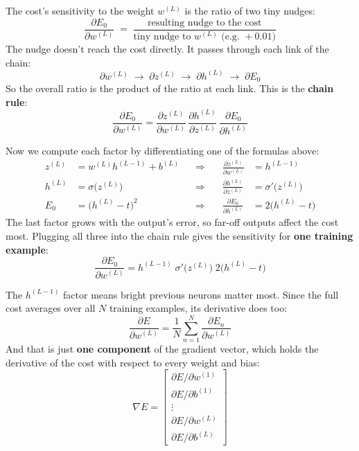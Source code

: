 \begin{keeptogether}
The cost's sensitivity to the weight $w^{(L)}$ is the ratio of two tiny nudges:
\[
\frac{\partial E_0}{\partial w^{(L)}} \;=\; \frac{\text{resulting nudge to the cost}}{\text{tiny nudge to } w^{(L)} \text{ (e.g.\ } +0.01\text{)}}
\]
The nudge doesn't reach the cost directly. It passes through each link of the chain:
\[
\partial w^{(L)} \;\longrightarrow\; \partial z^{(L)} \;\longrightarrow\; \partial h^{(L)} \;\longrightarrow\; \partial E_0
\]
So the overall ratio is the product of the ratio at each link. This is the \textbf{chain rule}:
\[
\frac{\partial E_0}{\partial w^{(L)}}
=
\frac{\partial z^{(L)}}{\partial w^{(L)}}\,
\frac{\partial h^{(L)}}{\partial z^{(L)}}\,
\frac{\partial E_0}{\partial h^{(L)}}
\]
\end{keeptogether}

\begin{keeptogether}
Now we compute each factor by differentiating one of the formulas above:
\[
\begin{aligned}
z^{(L)} &= w^{(L)} h^{(L-1)} + b^{(L)} &&\Longrightarrow\quad & \frac{\partial z^{(L)}}{\partial w^{(L)}} &= h^{(L-1)} \\[4pt]
h^{(L)} &= \sigma\big(z^{(L)}\big) &&\Longrightarrow\quad & \frac{\partial h^{(L)}}{\partial z^{(L)}} &= \sigma'\big(z^{(L)}\big) \\[4pt]
E_0 &= \big(h^{(L)} - t\big)^2 &&\Longrightarrow\quad & \frac{\partial E_0}{\partial h^{(L)}} &= 2\big(h^{(L)} - t\big)
\end{aligned}
\]
The last factor grows with the output's error, so far-off outputs affect the cost most. Plugging all three into the chain rule gives the sensitivity for \textbf{one training example}:
\[
\frac{\partial E_0}{\partial w^{(L)}} = h^{(L-1)}\; \sigma'\big(z^{(L)}\big)\; 2\big(h^{(L)} - t\big)
\]
\end{keeptogether}

\begin{keeptogether}
The $h^{(L-1)}$ factor means bright previous neurons matter most. Since the full cost averages over all $N$ training examples, its derivative does too:
\[
\frac{\partial E}{\partial w^{(L)}} = \frac{1}{N} \sum_{n=1}^{N} \frac{\partial E_n}{\partial w^{(L)}}
\]
And that is just \textbf{one component} of the gradient vector, which holds the derivative of the cost with respect to every weight and bias:
\[
\nabla E = \begin{bmatrix} \partial E / \partial w^{(1)} \\ \partial E / \partial b^{(1)} \\ \vdots \\ \partial E / \partial w^{(L)} \\ \partial E / \partial b^{(L)} \end{bmatrix}
\]
\end{keeptogether}

